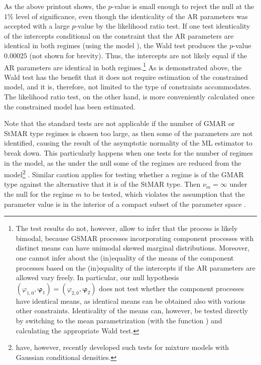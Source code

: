 \documentclass[nojss]{jss} %
\begin{document}
As the above printout shows, the $p$-value is small enough to reject the null at the $1\%$ level of significance, even though the identicality of the AR parameters was accepted with a large $p$-value by the likelihood ratio test. If one test identicality of the intercepts conditional on the constraint that the AR parameters are identical in both regimes (using the model ), the Wald test produces the $p$-value $0.00025$ (not shown for brevity). Thus, the intercepts are not likely equal if the AR parameters are identical in both regimes.\footnote{The test results do not, however, allow to infer that the process is likely bimodal, because GSMAR processes incorporating component processes with distinct means can have unimodal skewed marginal distributions. Moreover, one cannot infer about the (in)equality of the means of the component processes based on the (in)equality of the intercepts if the AR parameters are allowed vary freely. In particular, our null hypothesis $(\varphi_{1,0},\boldsymbol{\varphi}_1) = (\varphi_{2,0},\boldsymbol{\varphi}_2)$ does not test whether the component processes have identical means, as identical means can be obtained also with various other constraints. Identicality of the means can, however, be tested directly by switching to the mean parametrization (with the function ) and calculating the appropriate Wald test.} As is demonstrated above, the Wald test has the benefit that it does not require estimation of the constrained model, and it is, therefore, not limited to the type of constraints  accommodates. The likelihood ratio test, on the other hand, is more conveniently calculated once the constrained model has been estimated.

Note that the standard tests are not applicable if the number of GMAR or StMAR type regimes is chosen too large, as then some of the parameters are not identified, causing the result of the asymptotic normality of the ML estimator to break down. This particularly happens when one tests for the number of regimes in the model, as the under the null some of the regimes are reduced from the model\footnote{\cite{Meitz+Saikkonen:2021} have, however, recently developed such tests for mixture models with Gaussian conditional densities.} \citep[see the related discussion in][Section 3.3.2]{Kalliovirta+Meitz+Saikkonen:2015}. Similar caution applies for testing whether a regime is of the GMAR type against the alternative that it is of the StMAR type. Then $\nu_m = \infty$ under the null for the regime $m$ to be tested, which violates the assumption that the parameter value is in the interior of a compact subset of the parameter space \citep[see][Theorem 2 and Assumption 1]{Virolainen:2020}.
\end{document}
